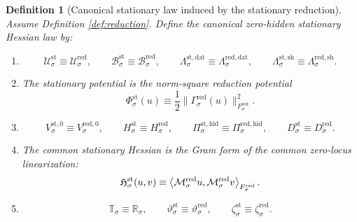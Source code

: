 \documentclass[11pt]{article}
\newcommand{\StatSpace}[1]{\mathcal U_{#1}^{\mathrm{st}}}
\newcommand{\StatBody}[1]{\mathcal B_{#1}^{\mathrm{st}}}
\newcommand{\StatData}[1]{\Lambda_{#1}^{\mathrm{st,dat}}}
\newcommand{\StatShell}[1]{\Lambda_{#1}^{\mathrm{st,sh}}}
\newcommand{\StatPotential}[1]{\Phi_{#1}^{\mathrm{st}}}
\newcommand{\StatZero}[1]{V_{#1}^{\mathrm{st},0}}
\newcommand{\StatHidden}[1]{H_{#1}^{\mathrm{st}}}
\newcommand{\StatHiddenBody}[1]{D_{#1}^{\mathrm{st}}}
\newcommand{\StatProj}[1]{\Pi_{#1}^{\mathrm{st,hid}}}
\newcommand{\StatHess}[1]{\mathfrak H_{#1}^{\mathrm{st}}}
\newcommand{\StatSym}[1]{\mathbb T_{#1}}
\newcommand{\StatTime}[1]{\vartheta_{#1}^{\mathrm{st}}}
\newcommand{\StatEmbed}[1]{\zeta_{#1}^{\mathrm{st}}}
\newcommand{\RedSpace}[1]{\mathcal U_{#1}^{\mathrm{red}}}
\newcommand{\RedBody}[1]{\mathcal B_{#1}^{\mathrm{red}}}
\newcommand{\RedData}[1]{\Lambda_{#1}^{\mathrm{red,dat}}}
\newcommand{\RedShell}[1]{\Lambda_{#1}^{\mathrm{red,sh}}}
\newcommand{\RedTarget}[1]{F_{#1}^{\mathrm{red}}}
\newcommand{\RedMap}[1]{\Gamma_{#1}^{\mathrm{red}}}
\newcommand{\RedZero}[1]{V_{#1}^{\mathrm{red},0}}
\newcommand{\RedHidden}[1]{H_{#1}^{\mathrm{red}}}
\newcommand{\RedHiddenBody}[1]{D_{#1}^{\mathrm{red}}}
\newcommand{\RedProj}[1]{\Pi_{#1}^{\mathrm{red,hid}}}
\newcommand{\RedLin}[1]{\mathcal M_{#1}^{\mathrm{red}}}
\newcommand{\RedSym}[1]{\mathbb R_{#1}}
\newcommand{\RedTime}[1]{\vartheta_{#1}^{\mathrm{red}}}
\newcommand{\RedEmbed}[1]{\zeta_{#1}^{\mathrm{red}}}
\newtheorem{definition}{Definition}
\begin{document}
\begin{definition}[Canonical stationary law induced by the stationary reduction]
\label{def:canonical}
Assume Definition \ref{def:reduction}. Define the canonical zero-hidden stationary Hessian law by:
\begin{enumerate}
    \item
    \[
    \StatSpace{\sigma}\equiv\RedSpace{\sigma},
    \qquad
    \StatBody{\sigma}\equiv\RedBody{\sigma},
    \qquad
    \StatData{\sigma}\equiv\RedData{\sigma},
    \qquad
    \StatShell{\sigma}\equiv\RedShell{\sigma}.
    \]
    \item The stationary potential is the norm-square reduction potential
    \begin{equation}
    \StatPotential{\sigma}(u)
    \equiv
    \frac{1}{2}
    \|\RedMap{\sigma}(u)\|_{\RedTarget{\sigma}}^{2}.
    \label{eq:statpotential}
    \end{equation}
    \item
    \[
    \StatZero{\sigma}\equiv\RedZero{\sigma},
    \qquad
    \StatHidden{\sigma}\equiv\RedHidden{\sigma},
    \qquad
    \StatProj{\sigma}\equiv\RedProj{\sigma},
    \qquad
    \StatHiddenBody{\sigma}\equiv\RedHiddenBody{\sigma}.
    \]
    \item The common stationary Hessian is the Gram form of the common zero-locus linearization:
    \begin{equation}
    \StatHess{\sigma}(u,v)
    \equiv
    \ev{\RedLin{\sigma}u,\RedLin{\sigma}v}_{\RedTarget{\sigma}}.
    \label{eq:gram}
    \end{equation}
    \item
    \[
    \StatSym{\sigma}\equiv\RedSym{\sigma},
    \qquad
    \StatTime{\sigma}\equiv\RedTime{\sigma},
    \qquad
    \StatEmbed{\sigma}\equiv\RedEmbed{\sigma}.
    \]
\end{enumerate}
\end{definition}
\end{document}
